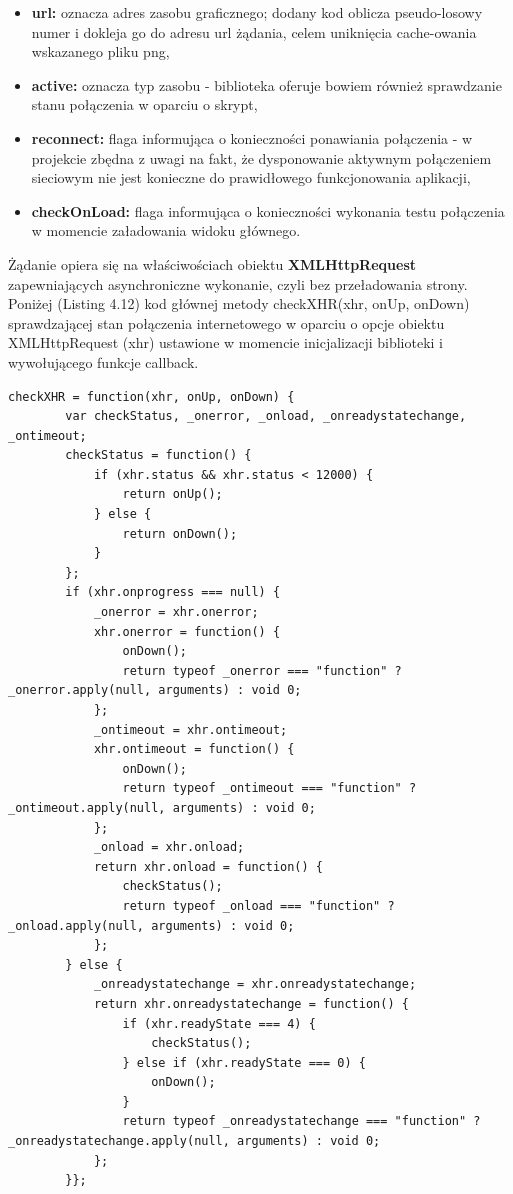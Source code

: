 \begin{itemize}
\item \textbf{url:} oznacza adres zasobu graficznego; dodany kod oblicza pseudo-losowy numer i dokleja go do adresu url żądania, celem uniknięcia cache-owania wskazanego pliku png,
\item \textbf{active:} oznacza typ zasobu - biblioteka oferuje bowiem również sprawdzanie stanu połączenia w oparciu o skrypt,
\item \textbf{reconnect:} flaga informująca o konieczności ponawiania połączenia - w projekcie zbędna z uwagi na fakt, że dysponowanie aktywnym połączeniem sieciowym nie jest konieczne do prawidłowego funkcjonowania aplikacji,
\item \textbf{checkOnLoad:} flaga informująca o konieczności wykonania testu połączenia w momencie załadowania widoku głównego.
\end{itemize}

Żądanie opiera się na właściwościach obiektu \textbf{XMLHttpRequest} zapewniających asynchroniczne wykonanie, czyli bez przeładowania strony. Poniżej (Listing 4.12) kod głównej metody checkXHR(xhr, onUp, onDown) sprawdzającej stan połączenia internetowego w oparciu o opcje obiektu XMLHttpRequest (xhr) ustawione w momencie inicjalizacji biblioteki i wywołującego funkcje callback.

\begin{lstlisting}[style=js, caption=Metoda checkXHR() wykonująca żądanie AJAX załadowania zasobu graficznego., label=amb, captionpos=b]
checkXHR = function(xhr, onUp, onDown) {
        var checkStatus, _onerror, _onload, _onreadystatechange, _ontimeout;
        checkStatus = function() {
            if (xhr.status && xhr.status < 12000) {
                return onUp();
            } else {
                return onDown();
            }
        };
        if (xhr.onprogress === null) {
            _onerror = xhr.onerror;
            xhr.onerror = function() {
                onDown();
                return typeof _onerror === "function" ? _onerror.apply(null, arguments) : void 0;
            };
            _ontimeout = xhr.ontimeout;
            xhr.ontimeout = function() {
                onDown();
                return typeof _ontimeout === "function" ? _ontimeout.apply(null, arguments) : void 0;
            };
            _onload = xhr.onload;
            return xhr.onload = function() {
                checkStatus();
                return typeof _onload === "function" ? _onload.apply(null, arguments) : void 0;
            };
        } else {
            _onreadystatechange = xhr.onreadystatechange;
            return xhr.onreadystatechange = function() {
                if (xhr.readyState === 4) {
                    checkStatus();
                } else if (xhr.readyState === 0) {
                    onDown();
                }
                return typeof _onreadystatechange === "function" ? _onreadystatechange.apply(null, arguments) : void 0;
            };
        }};
\end{lstlisting}

